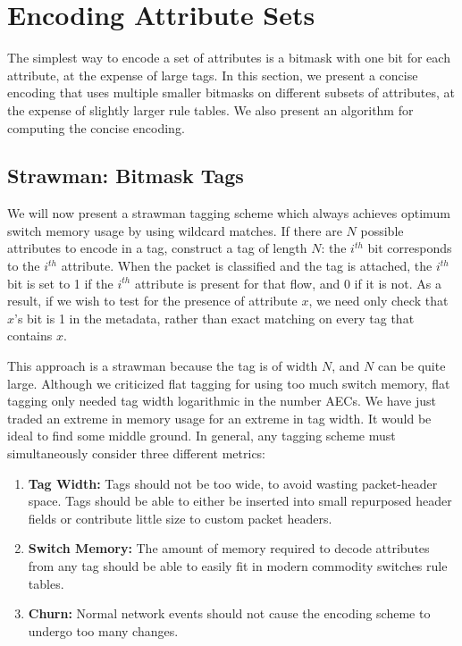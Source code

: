 \section{Encoding Attribute Sets}
\label{sec:flextag_encoding} 
The simplest way to encode a set of attributes is a bitmask with one
bit for each attribute, at the expense of large tags.  In this
section, we present a concise encoding that uses multiple smaller
bitmasks on different subsets of attributes, at the expense of
slightly larger rule tables.  We also present an algorithm for
computing the concise encoding.

\subsection{Strawman: Bitmask Tags}

We will now present a strawman tagging scheme which always achieves optimum switch memory usage by using wildcard matches.
If there are $N$ possible attributes to encode in a tag, construct a tag of length $N$: 
the $i^{th}$ bit corresponds to the $i^{th}$ attribute. When the packet is classified
and the tag is attached, the $i^{th}$ bit is set to 1 if the $i^{th}$ attribute
is present for that flow, and 0 if it is not. As a result, if we wish to test for
the presence of attribute $x$, we need only check that $x$'s bit is 1 in the
metadata, rather than exact matching on every tag that contains
$x$.

This approach is a strawman because the tag is of width $N$, and $N$ can be quite large.
Although we criticized flat tagging for using too much switch memory, 
flat tagging only needed tag width logarithmic in the number AECs. We have just traded an extreme in memory
usage for an extreme in tag width. It would be ideal to find some middle ground.
In general, any tagging scheme must simultaneously consider three different metrics:

\begin{enumerate}
\item \textbf{Tag Width:} Tags should not be too wide, to avoid wasting packet-header space.
Tags should be able to either be inserted into small repurposed header fields or contribute little size to custom packet headers. 
\item \textbf{Switch Memory:} The amount of memory required to decode attributes from any tag should be able to easily fit in modern commodity switches rule tables.
\item \textbf{Churn:} Normal network events should not cause the encoding scheme to undergo too many changes.
\end{enumerate}


